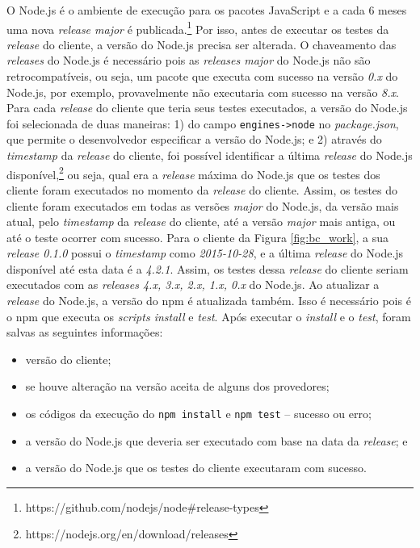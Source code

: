 O \textsf{Node.js} é o ambiente de execução para os pacotes \textsf{JavaScript} e a cada 6 meses uma nova \textit{release major} é publicada.\footnote{https://github.com/nodejs/node\#release-types} Por isso, antes de executar os testes da \textit{release} do cliente, a versão do \textsf{Node.js} precisa ser alterada. O chaveamento das \textit{releases} do \textsf{Node.js} é necessário pois as \textit{releases major} do \textsf{Node.js} não são retrocompatíveis, ou seja, um pacote que executa com sucesso na versão \textit{0.x} do \textsf{Node.js}, por exemplo, provavelmente não executaria com sucesso na versão \textit{8.x}. Para cada \textit{release} do cliente que teria seus testes executados, a versão do \textsf{Node.js} foi selecionada de duas maneiras: 1) do campo \texttt{engines->node} no \textit{package.json}, que permite o desenvolvedor especificar a versão do \textsf{Node.js}; e 2) através do \textit{timestamp} da \textit{release} do cliente, foi possível identificar a última \textit{release} do \textsf{Node.js} disponível,\footnote{https://nodejs.org/en/download/releases} ou seja, qual era a \textit{release} máxima do \textsf{Node.js} que os testes dos cliente foram executados no momento da \textit{release} do cliente. Assim, os testes do cliente foram executados em todas as versões \textit{major} do \textsf{Node.js}, da versão mais atual, pelo \textit{timestamp} da \textit{release} do cliente, até a versão \textit{major} mais antiga, ou até o teste ocorrer com sucesso. Para o cliente da Figura \ref{fig:bc_work}, a sua \textit{release 0.1.0} possui o \textit{timestamp} como \textit{2015-10-28}, e a última \textit{release} do \textsf{Node.js} disponível até esta data é a \textit{4.2.1}. Assim, os testes dessa \textit{release} do cliente seriam executados com as \textit{releases 4.x, 3.x, 2.x, 1.x, 0.x} do \textsf{Node.js}. Ao atualizar a \textit{release} do \textsf{Node.js}, a versão do \textsf{npm} é atualizada também. Isso é necessário pois é o \textsf{npm} que executa os \textit{scripts install} e \textit{test}. Após executar o \textit{install} e o \textit{test}, foram salvas as seguintes informações:

\begin{itemize}
    \item versão do cliente;
    \item se houve alteração na versão aceita de alguns dos provedores;
    \item os códigos da execução do \texttt{npm install} e \texttt{npm test} -- sucesso ou erro;
    \item a versão do \textsf{Node.js} que deveria ser executado com base na data da \textit{release}; e
    \item a versão do \textsf{Node.js} que os testes do cliente executaram com sucesso.
\end{itemize}{}

